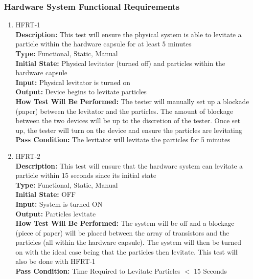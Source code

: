 \documentclass[12pt, titlepage]{article}
\begin{document}
\subsubsection{Hardware System Functional Requirements}
\begin{enumerate}
    \item{HFRT-1\\}
    \textbf{Description:} This test will ensure the physical system is able to levitate a particle within the hardware capsule for at least 5 minutes\\
    \textbf{Type:} Functional, Static, Manual\\
    \textbf{Initial State:} Physical levitator (turned off) and particles within the hardware capsule\\
    \textbf{Input:} Physical levitator is turned on\\
    \textbf{Output:} Device begins to levitate particles\\
    \textbf{How Test Will Be Performed:} The tester will manually set up a blockade (paper) between the levitator and the particles. The amount of blockage between the two devices will be up to the discretion of the tester. Once set up, the tester will turn on the device and ensure the particles are levitating\\ 
    \textbf{Pass Condition:} The levitator will levitate the particles for 5 minutes\\

    \item{HFRT-2\\}
    \textbf{Description:} This test will ensure that the hardware system can levitate a particle within 15 seconds since its initial state\\
    \textbf{Type:} Functional, Static, Manual\\
    \textbf{Initial State:} OFF\\
    \textbf{Input:} System is turned ON\\
    \textbf{Output:} Particles levitate\\
    \textbf{How Test Will Be Performed:} The system will be off and a blockage (piece of paper) will be placed between the array of transistors and the particles (all within the hardware capsule). The system will then be turned on with the ideal case being that the particles then levitate. This test will also be done with HFRT-1\\
    \textbf{Pass Condition:} Time Required to Levitate Particles $<$ 15 Seconds\\
\end{enumerate}
\end{document}

